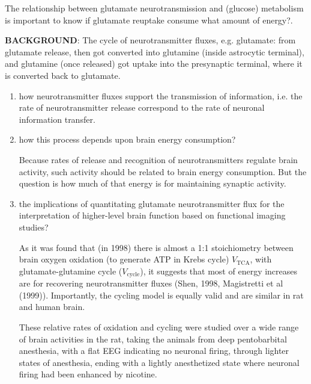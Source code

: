 The relationship between glutamate neurotransmission and (glucose) metabolism is
important to know if glutamate reuptake consume what amount of energy?.

{\bf BACKGROUND}: The cycle of neurotransmitter fluxes, e.g. glutamate: from
glutamate release, then got converted into glutamine (inside astrocytic 
terminal), and glutamine (once released) got uptake into the presynaptic
terminal, where it is converted back to glutamate.

\begin{enumerate}
  
  \item how neurotransmitter fluxes support the transmission of information,
  i.e. the rate of neurotransmitter release correspond to the rate of neuronal
  information transfer.
  
  \item how this process depends upon brain energy consumption?

Because rates of release and recognition of neurotransmitters regulate brain
activity, such activity should be related to brain energy consumption. But the
question is how much of that energy is for maintaining synaptic activity.
  
  \item the implications of quantitating glutamate neurotransmitter flux 
  for the interpretation of higher-level brain function based on functional imaging studies?
  
  
  As it was found that (in 1998) there is almost a 1:1 stoichiometry between
  brain oxygen oxidation (to generate ATP in Krebs cycle) $V_{\text{TCA}}$, with
  glutamate-glutamine cycle ($V_{\text{cycle}}$), it suggests that most of
  energy increases are for recovering neurotransmitter fluxes (Shen, 1998,
  Magistretti et al (1999)).
  Importantly, the cycling model is equally valid and are similar in rat and
  human brain.
  
   These relative rates of oxidation and cycling were studied over a wide range
   of brain activities in the rat, taking the animals from deep pentobarbital
   anesthesia, with a flat EEG indicating no neuronal firing, through lighter
   states of anesthesia, ending with a lightly anesthetized state where neuronal
   firing had been enhanced by nicotine.
  
  
%   


  
\end{enumerate}


